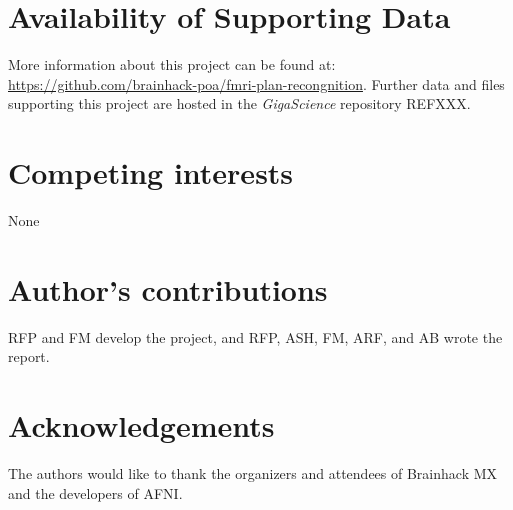 \documentclass[twocolumn]{bmcart}%
\begin{document}
\begin{backmatter}

\section*{Availability of Supporting Data}
More information about this project can be found at: \url{https://github.com/brainhack-poa/fmri-plan-recongnition}. Further data and files supporting this project are hosted in the \emph{GigaScience} repository REFXXX.

\section*{Competing interests}
None

\section*{Author's contributions}
RFP and FM develop the project, and RFP, ASH, FM, ARF, and AB wrote the
report.

\section*{Acknowledgements}
The authors would like to thank the organizers and attendees of
Brainhack MX and the developers of AFNI.

  
  


\end{backmatter}
\end{document}
